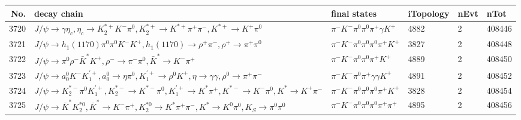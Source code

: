 \begin{table}[htbp] 
\begin{center}
\begin{small}
\begin{tabular}{rlllll}\hline\hline
 No. & decay chain & final states &  iTopology & nEvt & nTot \\\hline
3720&$J/\psi       \rightarrow \gamma       \eta_{c}    , \eta_{c}     \rightarrow K_2^{*+}       K^{-}          \pi^{0}        , K_2^{*+}        \rightarrow K^{*+}         \pi^{+}        \pi^{-}        , K^{*+}          \rightarrow K^{+}          \pi^{0}        $&$\pi^{-}        K^{-}          \pi^{0}        \pi^{0}        \pi^{+}        \gamma       K^{+}          $& 4882&    2&408446\\
3721&$J/\psi       \rightarrow h_{1}(1170)    \pi^{0}        \pi^{0}        K^{-}          K^{+}          , h_{1}(1170)     \rightarrow \rho^{+}      \pi^{-}        , \rho^{+}       \rightarrow \pi^{+}        \pi^{0}        $&$\pi^{-}        K^{-}          \pi^{0}        \pi^{0}        \pi^{0}        \pi^{+}        K^{+}          $& 3827&    2&408448\\
3722&$J/\psi       \rightarrow \pi^{0}        \rho^{-}      \bar{K}^{*}   K^{+}          , \rho^{-}       \rightarrow \pi^{-}        \pi^{0}        , \bar{K}^{*}    \rightarrow K^{-}          \pi^{+}        $&$\pi^{-}        K^{-}          \pi^{0}        \pi^{0}        \pi^{+}        K^{+}          $& 4889&    2&408450\\
3723&$J/\psi       \rightarrow a_{0}^{0}      K^{-}          K_1^{'+}      , a_{0}^{0}       \rightarrow \eta          \pi^{0}        , K_1^{'+}       \rightarrow \rho^{0}      K^{+}          , \eta           \rightarrow \gamma       \gamma       , \rho^{0}       \rightarrow \pi^{+}        \pi^{-}        $&$\pi^{-}        K^{-}          \pi^{0}        \pi^{+}        \gamma       \gamma       K^{+}          $& 4891&    2&408452\\
3724&$J/\psi       \rightarrow K_2^{*-}       \pi^{0}        K_1^{'+}      , K_2^{*-}        \rightarrow K^{*-}         \pi^{0}        , K_1^{'+}       \rightarrow K^{*}          \pi^{+}        , K^{*-}          \rightarrow K^{-}          \pi^{0}        , K^{*}           \rightarrow K^{+}          \pi^{-}        $&$\pi^{-}        K^{-}          \pi^{0}        \pi^{0}        \pi^{0}        \pi^{+}        K^{+}          $& 3828&    2&408454\\
3725&$J/\psi       \rightarrow \bar{K}^{*}   K_2^{*0}       , \bar{K}^{*}    \rightarrow K^{-}          \pi^{+}        , K_2^{*0}        \rightarrow K^{*}          \pi^{+}        \pi^{-}        , K^{*}           \rightarrow K^{0}          \pi^{0}        , K_{S}           \rightarrow \pi^{0}        \pi^{0}        $&$\pi^{-}        K^{-}          \pi^{0}        \pi^{0}        \pi^{0}        \pi^{+}        \pi^{+}        $& 4895&    2&408456\\

\end{tabular}
\end{small}
\end{center}
\end{table}
